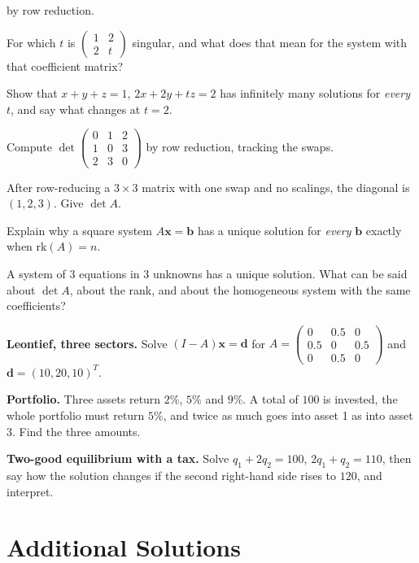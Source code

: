 \begin{problems}
        by row reduction.
  \item For which $t$ is $\begin{pmatrix}1&2\\2&t\end{pmatrix}$ singular,
        and what does that mean for the system with that coefficient
        matrix?
  \item Show that $x+y+z=1$, \;$2x+2y+tz=2$ has infinitely many solutions
        for \emph{every} $t$, and say what changes at $t=2$.
  \item Compute $\det\begin{pmatrix}0&1&2\\1&0&3\\2&3&0\end{pmatrix}$ by
        row reduction, tracking the swaps.
  \item After row-reducing a $3\times3$ matrix with one swap and no
        scalings, the diagonal is $(1,2,3)$. Give $\det A$.
  \item Explain why a square system $A\mathbf{x}=\mathbf{b}$ has a unique
        solution for \emph{every} $\mathbf{b}$ exactly when
        $\mathrm{rk}(A)=n$.
  \item A system of $3$ equations in $3$ unknowns has a unique solution.
        What can be said about $\det A$, about the rank, and about the
        homogeneous system with the same coefficients?
  \item \textbf{Leontief, three sectors.} Solve
        $(I-A)\mathbf{x}=\mathbf{d}$ for
        $A=\begin{pmatrix}0&0.5&0\\0.5&0&0.5\\0&0.5&0\end{pmatrix}$ and
        $\mathbf{d}=(10,20,10)^{T}$.
  \item \textbf{Portfolio.} Three assets return $2\%$, $5\%$ and $9\%$. A
        total of $100$ is invested, the whole portfolio must return
        $5\%$, and twice as much goes into asset 1 as into asset 3.
        Find the three amounts.
  \item \textbf{Two-good equilibrium with a tax.} Solve
        $q_{1}+2q_{2}=100$, \;$2q_{1}+q_{2}=110$, then say how the solution
        changes if the second right-hand side rises to $120$, and
        interpret.
\end{problems}

\section{Additional Solutions}

